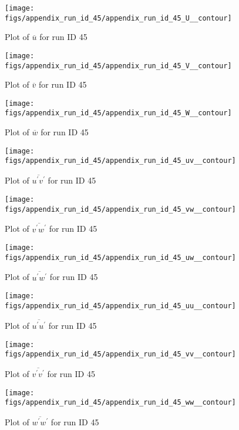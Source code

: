 \begin{figure}[H]
\centering
\texttt{[image: figs/appendix\_run\_id\_45/appendix\_run\_id\_45\_U\_\_contour]}
\caption{Plot of $\overline{u}$ for run ID 45}
\label{fig:appendix_run_id_45_U__contour}
\end{figure}


\begin{figure}[H]
\centering
\texttt{[image: figs/appendix\_run\_id\_45/appendix\_run\_id\_45\_V\_\_contour]}
\caption{Plot of $\overline{v}$ for run ID 45}
\label{fig:appendix_run_id_45_V__contour}
\end{figure}


\begin{figure}[H]
\centering
\texttt{[image: figs/appendix\_run\_id\_45/appendix\_run\_id\_45\_W\_\_contour]}
\caption{Plot of $\overline{w}$ for run ID 45}
\label{fig:appendix_run_id_45_W__contour}
\end{figure}


\begin{figure}[H]
\centering
\texttt{[image: figs/appendix\_run\_id\_45/appendix\_run\_id\_45\_uv\_\_contour]}
\caption{Plot of $\overline{u^\prime v^\prime}$ for run ID 45}
\label{fig:appendix_run_id_45_uv__contour}
\end{figure}


\begin{figure}[H]
\centering
\texttt{[image: figs/appendix\_run\_id\_45/appendix\_run\_id\_45\_vw\_\_contour]}
\caption{Plot of $\overline{v^\prime w^\prime}$ for run ID 45}
\label{fig:appendix_run_id_45_vw__contour}
\end{figure}


\begin{figure}[H]
\centering
\texttt{[image: figs/appendix\_run\_id\_45/appendix\_run\_id\_45\_uw\_\_contour]}
\caption{Plot of $\overline{u^\prime w^\prime}$ for run ID 45}
\label{fig:appendix_run_id_45_uw__contour}
\end{figure}


\begin{figure}[H]
\centering
\texttt{[image: figs/appendix\_run\_id\_45/appendix\_run\_id\_45\_uu\_\_contour]}
\caption{Plot of $\overline{u^\prime u^\prime}$ for run ID 45}
\label{fig:appendix_run_id_45_uu__contour}
\end{figure}


\begin{figure}[H]
\centering
\texttt{[image: figs/appendix\_run\_id\_45/appendix\_run\_id\_45\_vv\_\_contour]}
\caption{Plot of $\overline{v^\prime v^\prime}$ for run ID 45}
\label{fig:appendix_run_id_45_vv__contour}
\end{figure}


\begin{figure}[H]
\centering
\texttt{[image: figs/appendix\_run\_id\_45/appendix\_run\_id\_45\_ww\_\_contour]}
\caption{Plot of $\overline{w^\prime w^\prime}$ for run ID 45}
\label{fig:appendix_run_id_45_ww__contour}
\end{figure}


